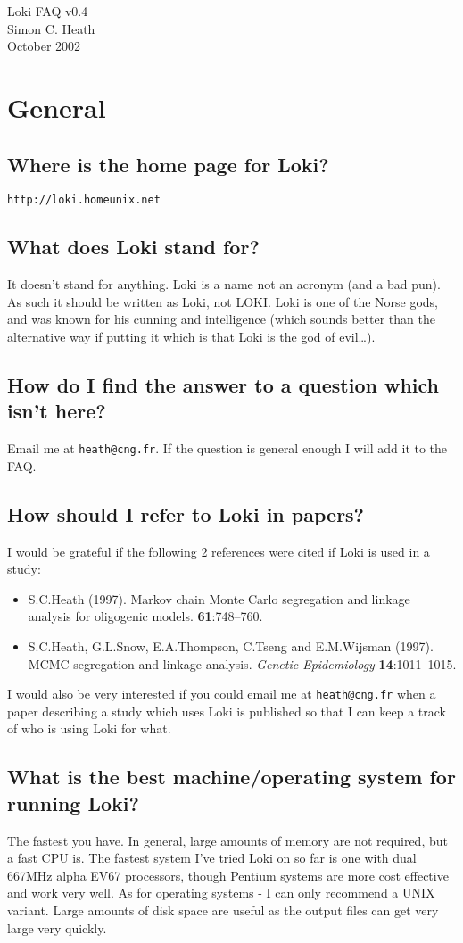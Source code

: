 \documentclass[10pt]{article}
\begin{document}
\begin{center}
	 \Large{Loki FAQ v0.4}\\
	 Simon C. Heath\\
	 October 2002
\end{center}
\section{General}
\subsection{Where is the home page for Loki?}
\verb+http://loki.homeunix.net+
\subsection{What does Loki stand for?}
It doesn't stand for anything.  Loki is a name not an acronym (and a bad
pun).  As such it should be written as Loki, not LOKI.  Loki is one of the
Norse gods, and was known for his cunning and intelligence (which sounds
better than the alternative way if putting it which is that Loki is the god
of evil{\ldots}).
\subsection{How do I find the answer to a question which isn't here?}
Email me at \verb+heath@cng.fr+.  If the question is general enough
I will add it to the FAQ.
\subsection{How should I refer to Loki in papers?}
I would be grateful if the following 2 references
were cited if Loki is used in a study:
\begin{itemize}
\item S.C.Heath (1997). Markov chain Monte Carlo segregation and linkage analysis
for oligogenic models. \textbf{61}:748--760.
\item S.C.Heath, G.L.Snow, E.A.Thompson, C.Tseng and E.M.Wijsman (1997). MCMC
segregation and linkage analysis. \emph{Genetic Epidemiology}
\textbf{14}:1011--1015.
\end{itemize}
I would also be very interested if you could email me at
\verb+heath@cng.fr+ when a
paper describing a study which uses Loki is published so that I can keep a
track of who is using Loki for what.
\subsection{What is the best machine/operating system for running Loki?}
The fastest you have.  In general, large amounts of memory are not required,
but a fast CPU is.  The fastest system I've tried Loki on so far is one with dual
667MHz alpha EV67 processors, though Pentium systems are more cost effective
and work very well.  As for operating systems - I can only recommend a UNIX
variant.  Large amounts of disk space are useful as the output files can get
very large very quickly.
\end{document}
